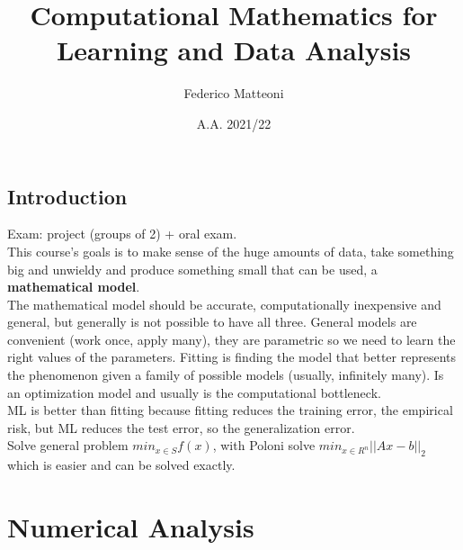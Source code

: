 \documentclass[10pt]{report}
\begin{document}
\title{Computational Mathematics for Learning and Data Analysis}
\author{Federico Matteoni}
\date{A.A. 2021/22}
\renewcommand*\contentsname{Index}

\maketitle
\begin{multicols}{2}
\tableofcontents
\end{multicols}
\pagebreak
\section{Introduction}
Exam: project (groups of 2) + oral exam.\\
This course's goals is to make sense of the huge amounts of data, take something big and unwieldy and produce something small that can be used, a \textbf{mathematical model}.\\
The mathematical model should be accurate, computationally inexpensive and general, but generally is not possible to have all three. General models are convenient (work once, apply many), they are parametric so we need to learn the right values of the parameters. Fitting is finding the model that better represents the phenomenon given a family of possible models (usually, infinitely many). Is an optimization model and usually is the computational bottleneck.\\
ML is better than fitting because fitting reduces the training error, the empirical risk, but ML reduces the test error, so the generalization error.\\
Solve general problem $min_{x\in S}f(x)$, with Poloni solve $min_{x\in R^n}||Ax - b||_2$ which is easier and can be solved exactly.
\chapter{Numerical Analysis}
\end{document}
